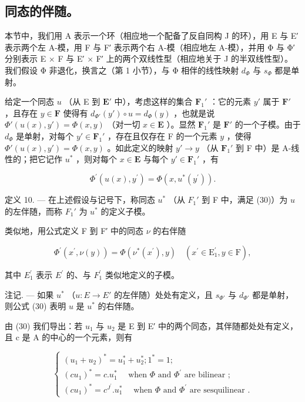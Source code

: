 \subsection{同态的伴随。}

本节中，我们用 A 表示一个环（相应地一个配备了反自同构 J 的环），用 E 与 E′ 表示两个左 A-模，用 F 与 F′ 表示两个右 A-模（相应地左 A-模），并用 Φ 与 Φ′ 分别表示 E × F 与 E′ × F′ 上的两个双线性型（相应地关于 J 的半双线性型）。我们假设 Φ 非退化，换言之（第 1 小节），与 Φ 相伴的线性映射 \(d_{\Phi}\) 与 \(s_{\Phi}\) 都是单射。

给定一个同态 \(u\) （从 E 到 \(\mathbf{E}'\) 中），考虑这样的集合 \(\mathbf{F}_{1}'\) ：它的元素 \(y'\) 属于 \(\mathbf{F}'\) ，且存在 \(y \in \mathbf{F}\) 使得有 \(d_{\Phi'}(y') \circ u = d_{\Phi}(y)\) ，也就是说 \(\Phi'(u(x), y') = \Phi(x, y)\) （对一切 \(x \in \mathbf{E}\) ）。显然 \(\mathbf{F}_{1}'\) 是 \(\mathbf{F}'\) 的一个子模。由于 \(d_{\Phi}\) 是单射，对每个 \(y' \in \mathbf{F}_{1}'\) ，存在且仅存在 F 的一个元素 \(y\) ，使得 \(\Phi'(u(x), y') = \Phi(x, y)\) 。如此定义的映射 \(y' \to y\) （从 \(\mathbf{F}_{1}'\) 到 F 中）是 A-线性的；把它记作 \(u^{*}\) ，则对每个 \(x \in \mathbf{E}\) 与每个 \(y' \in \mathbf{F}_{1}'\) ，有

\[
\Phi^ {\prime} (u (x), y ^ {\prime}) = \Phi (x, u ^ {*} (y ^ {\prime})).\tag{30}
\]

定义 10. --- 在上述假设与记号下，称同态 \(u^*\) （从 \(F_1'\) 到 F 中，满足 (30)）为 \(u\) 的左伴随，而称 \(F_1'\) 为 \(u^*\) 的定义子模。

类似地，用公式定义 F 到 F′ 中的同态 \(\nu\) 的右伴随

\[
\Phi^ {\prime} (x ^ {\prime}, \nu (y)) = \Phi (\nu^ {*} (x ^ {\prime}), y) \quad (x ^ {\prime} \in \mathrm{E} _ {1} ^ {\prime}, y \in \mathrm{F}),\tag{31}
\]

其中 \(E_{1}^{\prime}\) 表示 \(E^{\prime}\) 的、与 \(F_{1}^{\prime}\) 类似地定义的子模。

注记. --- 如果 \(u^{*}\) （\(u: E \to E'\) 的左伴随）处处有定义，且 \(s_{\Phi'}\) 与 \(d_{\Phi'}\) 都是单射，则公式 (30) 表明 \(u\) 是 \(u^{*}\) 的右伴随。

由 (30) 我们导出：若 \(u_1\) 与 \(u_2\) 是 E 到 E′ 中的两个同态，其伴随都处处有定义，且 c 是 A 的中心的一个元素，则有

\[
\left\{ \begin{array}{l} (u _ {1} + u _ {2}) ^ {*} = u _ {1} ^ {*} + u _ {2} ^ {*}; 1 ^ {*} = 1; \\ (c u _ {1}) ^ {*} = c. u _ {1} ^ {*} \quad \text { when } \Phi \text { and } \Phi^ {\prime} \text { are bilinear }; \\ (c u _ {1}) ^ {*} = c ^ {J ^ {\prime}}. u _ {1} ^ {*} \quad \text { when } \Phi \text { and } \Phi^ {\prime} \text { are sesquilinear }. \end{array} \right.\tag{32}
\]

